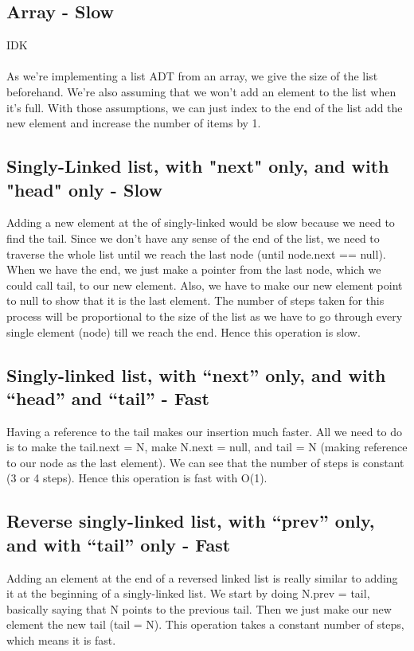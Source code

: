 \documentclass{article}
\begin{document}
\subsection{Array - Slow}
IDK\\\\
As we're implementing a list ADT from an array, we give the size of the list beforehand. We're also assuming that we won't add an element to the list when it's full. With those assumptions, we can just index to the end of the list add the new element and increase the number of items by 1.

\subsection{Singly-Linked list, with "next" only, and with "head" only - Slow}
Adding a new element at the of singly-linked would be slow because we need to find the tail. Since we don't have any sense of the end of the list, we need to traverse the whole list until we reach the last node (until node.next == null). When we have the end, we just make a pointer from the last node, which we could call tail, to our new element. Also, we have to make our new element point to null to show that it is the last element. The number of steps taken for this process will be proportional to the size of the list as we have to go through every single element (node) till we reach the end. Hence this operation is slow.

\subsection{Singly-linked list, with “next” only, and with “head” and “tail” - Fast}
Having a reference to the tail makes our insertion much faster. All we need to do is to make the tail.next = N, make N.next = null, and tail = N (making reference to our node as the last element). We can see that the number of steps is constant (3 or 4 steps). Hence this operation is fast with O(1).

\subsection{Reverse singly-linked list, with “prev” only, and with “tail” only - Fast}
Adding an element at the end of a reversed linked list is really similar to adding it at the beginning of a singly-linked list. We start by doing N.prev = tail, basically saying that N points to the previous tail. Then we just make our new element the new tail (tail = N). This operation takes a constant number of steps, which means it is fast.
\end{document}
